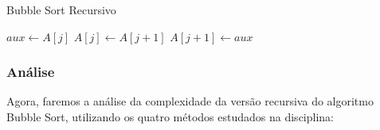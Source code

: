 \begin{algorithm}
	\caption{Bubble Sort Recursivo}
	\label{algo:bubble_sort_recursivo}
	\begin{algorithmic}[1]
		\Statex
		\Return{}
		\EndIf
		\State $aux \gets A[j]$
		\State $A[j] \gets A[j + 1]$
		\State $A[j + 1] \gets aux$
		\EndIf
		\EndFor
		\State {}
		\EndFunction
	\end{algorithmic}
\end{algorithm}

\subsubsection{Análise}
Agora, faremos a análise da complexidade da versão recursiva do algoritmo Bubble Sort, utilizando os quatro métodos estudados na disciplina:

